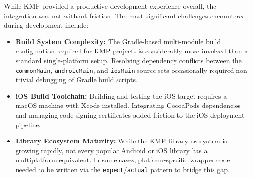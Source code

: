 While KMP provided a productive development experience overall, the integration
was not without friction. The most significant challenges encountered during
development include:

\begin{itemize}
    \item \textbf{Build System Complexity:} The Gradle-based multi-module build
    configuration required for KMP projects is considerably more involved than
    a standard single-platform setup. Resolving dependency conflicts between
    the \texttt{commonMain}, \texttt{androidMain}, and \texttt{iosMain} source
    sets occasionally required non-trivial debugging of Gradle build scripts.

    \item \textbf{iOS Build Toolchain:} Building and testing the iOS target
    requires a macOS machine with Xcode installed. Integrating CocoaPods
    dependencies and managing code signing certificates added friction to the
    iOS deployment pipeline.

    \item \textbf{Library Ecosystem Maturity:} While the KMP library ecosystem
    is growing rapidly, not every popular Android or iOS library has a
    multiplatform equivalent. In some cases, platform-specific wrapper code
    needed to be written via the \texttt{expect}/\texttt{actual} pattern to
    bridge this gap.
\end{itemize}

